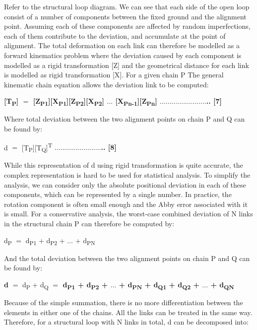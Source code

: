 \documentclass[11pt]{book}
\begin{document}
Refer to the structural loop diagram. We can see that each side of the open loop consist of a number of components between the fixed ground and the alignment point. Assuming each of these components are affected by random imperfections, each of them contribute to the deviation, and accumulate at the point of alignment. The total deformation on each link can therefore be modelled as a forward kinematics problem where the deviation caused by each component is modelled as a rigid transformation [Z] and the geometrical distance for each link is modelled as rigid transformation [X]. For a given chain P The general kinematic chain equation allows the deviation link to be computed:

\textbf{[T\textsubscript{P}] $=$ [Z\textsubscript{P1}][X\textsubscript{P1}][Z\textsubscript{P2}][X\textsubscript{P2}] $\ldots$ [X\textsubscript{Pn-1}][Z\textsubscript{Pn}] $\ldots$$\ldots$$\ldots$$\ldots$$\ldots$$\ldots$$\ldots$$\ldots$.. [7]}

Where total deviation between the two alignment points on chain P and Q can be found by:

d $=$ [T\textsubscript{P}][T\textsubscript{Q}]\textsuperscript{T}\textbf{ $\ldots$$\ldots$$\ldots$$\ldots$$\ldots$$\ldots$$\ldots$$\ldots$.. [8]}

While this representation of d using rigid transformation is quite accurate, the complex representation is hard to be used for statistical analysis. To simplify the analysis, we can consider only the absolute positional deviation in each of these components, which can be represented by a single number. In practice, the rotation component is often small enough and the Abby error associated with it is small. For a conservative analysis, the worst-case combined deviation of N links in the structural chain P can therefore be computed by:

d\textsubscript{P} $=$ d\textsubscript{P1} + d\textsubscript{P2} + $\ldots$ + d\textsubscript{PN} 

And the total deviation between the two alignment points on chain P and Q can be found by:

\textbf{d }$=$ d\textsubscript{P} + d\textsubscript{Q} \textbf{$=$ d\textsubscript{P1} + d\textsubscript{P2} + $\ldots$ + d\textsubscript{PN} + d\textsubscript{Q1} + d\textsubscript{Q2} + $\ldots$ + d\textsubscript{QN} }

Because of the simple summation, there is no more differentiation between the elements in either one of the chains. All the links can be treated in the same way. Therefore, for a structural loop with N links in total, d can be decomposed into:
\end{document}
